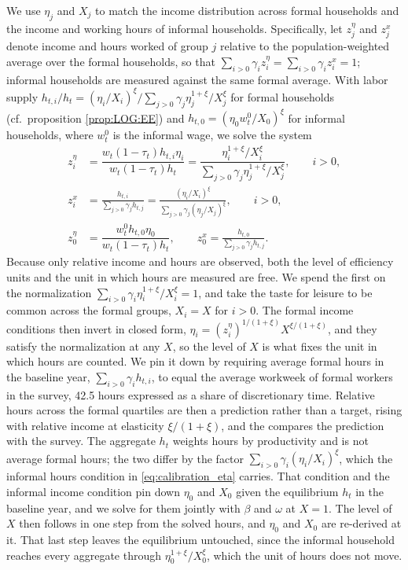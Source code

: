 We use $\eta_j$ and $X_j$ to match the income distribution across formal households and the income and working hours of informal households. Specifically, let $z_j^{\eta}$ and $z_j^{x}$ denote income and hours worked of group $j$ relative to the population-weighted average over the formal households, so that $\sum_{i>0}\gamma_iz_i^{\eta} = \sum_{i>0}\gamma_iz_i^{x} = 1$; informal households are measured against the same formal average. With labor supply $h_{t,i}/h_t = (\eta_i/X_i)^{\xi}/\sum_{j>0}\gamma_j\eta_j^{1+\xi}/X_j^{\xi}$ for formal households (cf.\ proposition \ref{prop:LOG:EE}) and $h_{t,0} = (\eta_0w_t^0/X_0)^{\xi}$ for informal households, where $w_t^0$ is the informal wage, we solve the system
\begin{align}\label{eq:calibration_eta}
        z_i^{\eta} &= \dfrac{w_t(1-\tau_t)h_{t,i} \eta_i}{w_t(1-\tau_t)h_t} = \dfrac{\eta_i^{1+\xi}/X_i^{\xi}}{\sum_{j>0} \gamma_ j\eta_j^{1+\xi}/X_j^{\xi}}, \qquad i>0,\\
        z_i^{x} &= \frac{h_{t,i}}{\sum_{j>0}\gamma_jh_{t,j}} = \frac{(\eta_i/X_i)^{\xi}}{\sum_{j>0}\gamma_j(\eta_j/X_j)^{\xi}}, \qquad i>0, \nonumber\\
         z_0^{\eta} &= \dfrac{w_t^0 h_{t,0} \eta_0}{w_t(1-\tau_t)h_t}, \qquad z_0^{x} = \frac{h_{t,0}}{\sum_{j>0}\gamma_jh_{t,j}}. \nonumber
    \end{align}
Because only relative income and hours are observed, both the level of efficiency units and the unit in which hours are measured are free. We spend the first on the normalization $\sum_{i>0}\gamma_i\eta_i^{1+\xi}/X_i^{\xi} = 1$, and take the taste for leisure to be common across the formal groups, $X_i = X$ for $i>0$. The formal income conditions then invert in closed form, $\eta_i = \left(z_i^{\eta}\right)^{1/(1+\xi)}X^{\xi/(1+\xi)}$, and they satisfy the normalization at any $X$, so the level of $X$ is what fixes the unit in which hours are counted. We pin it down by requiring average formal hours in the baseline year, $\sum_{i>0}\gamma_ih_{t,i}$, to equal the average workweek of formal workers in the survey, 42.5 hours expressed as a share of discretionary time. Relative hours across the formal quartiles are then a prediction rather than a target, rising with relative income at elasticity $\xi/(1+\xi)$, and the  compares the prediction with the survey. The aggregate $h_t$ weights hours by productivity and is not average formal hours; the two differ by the factor $\sum_{i>0}\gamma_i(\eta_i/X_i)^{\xi}$, which the informal hours condition in \eqref{eq:calibration_eta} carries. That condition and the informal income condition pin down $\eta_0$ and $X_0$ given the equilibrium $h_t$ in the baseline year, and we solve for them jointly with $\beta$ and $\omega$ at $X = 1$. The level of $X$ then follows in one step from the solved hours, and $\eta_0$ and $X_0$ are re-derived at it. That last step leaves the equilibrium untouched, since the informal household reaches every aggregate through $\eta_0^{1+\xi}/X_0^{\xi}$, which the unit of hours does not move.

